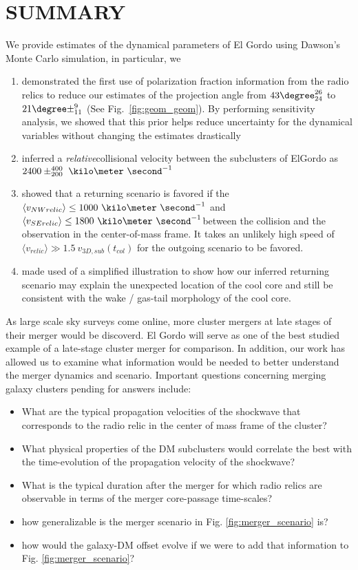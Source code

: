 %
\section{SUMMARY} 
We provide estimates of the dynamical parameters of El Gordo using Dawson's
Monte Carlo simulation, in particular, we 
\begin{enumerate}
	\item demonstrated the first use of polarization fraction information from
		the radio relics to reduce our estimates of the projection angle from
		$43\degree^{26}_{24}$ to $21 \degree \pm^{9}_{11}$ (See	Fig.~\ref{fig:geom_geom}). By performing sensitivity analysis, we showed that this prior helps reduce uncertainty for the dynamical variables without changing the estimates drastically\\ 
	\item inferred a {\it relative}\/collisional velocity between the subclusters of ElGordo as $2400\pm^{400}_{200}~\kilo\meter~\second^{-1}$ \\ 
	\item showed that a returning scenario is favored if the $\langle v_{NW relic}\rangle \leq
		1000~\kilo
		\meter~\second^{-1}$ and $\langle v_{SE relic}\rangle \leq
		1800~\kilo\meter~\second^{-1}$between the collision and the observation in the
		center-of-mass frame. It takes
		an unlikely high speed of $\langle v_{relic} \rangle \gg 1.5~v_{3D,
		sub}(t_{col})$ for the outgoing scenario to be favored.  
	\item made used of a simplified illustration to show how our inferred
		returning scenario may explain the unexpected location of the cool
		core and still be consistent with the wake / gas-tail morphology of the cool core. 
\end{enumerate}
As large scale sky surveys come online, more cluster mergers at late
stages of their merger would be discoverd. El Gordo will serve as one of
the best studied example of a late-stage cluster merger for comparison.  
In addition, our work has allowed us to examine
what information would be needed to better understand the merger
dynamics and scenario. Important questions concerning merging galaxy
clusters pending for answers include:  
\begin{itemize}
\item What are the typical propagation velocities of the shockwave that
corresponds to the radio relic in the	center of mass frame of the cluster?
\item What physical properties of the DM subclusters would correlate the
	best with the time-evolution of the propagation velocity of the shockwave?  
\item What is the typical duration
after the merger for which radio relics are observable in terms of the merger
core-passage time-scales? 
\item how generalizable is the merger scenario in Fig.
	\ref{fig:merger_scenario} is?  
\item how would the galaxy-DM offset evolve if we were to add that information
	to Fig. \ref{fig:merger_scenario}?
\end{itemize}
